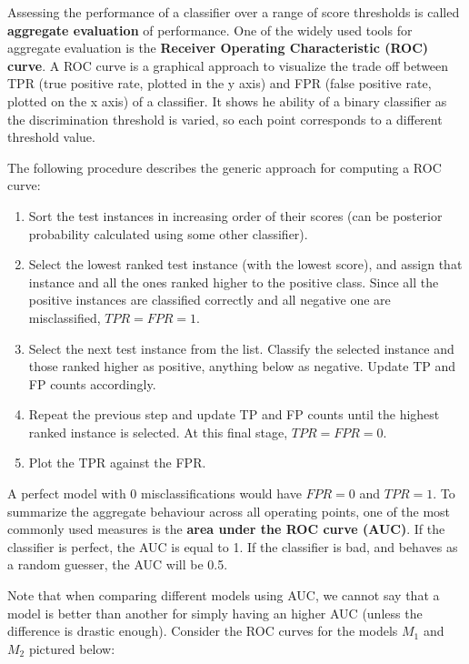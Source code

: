 Assessing the performance of a classifier over a range of score thresholds is called \textbf{aggregate evaluation} of performance. One of the widely used tools for aggregate evaluation is the \textbf{Receiver Operating Characteristic (ROC) curve}. A ROC curve is a graphical approach to visualize the trade off between TPR (true positive rate, plotted in the y axis) and FPR (false positive rate, plotted on the x axis) of a classifier. It shows he ability of a binary classifier as the discrimination threshold is varied, so each point corresponds to a different threshold value.

The following procedure describes the generic approach for computing a ROC curve:

\begin{enumerate}
    \item Sort the test instances in increasing order of their scores (can be posterior probability calculated using some other classifier).

    \item Select the lowest ranked test instance (with the lowest score), and assign that instance and all the ones ranked higher to the positive class. Since all the positive instances are classified correctly and all negative one are misclassified, $TPR = FPR = 1$.

    \item Select the next test instance from the list. Classify the selected instance and those ranked higher as positive, anything below as negative. Update TP and FP counts accordingly.

    \item Repeat the previous step and update TP and FP counts until the highest ranked instance is selected. At this final stage, $TPR = FPR = 0$.

    \item Plot the TPR against the FPR.
\end{enumerate}

A perfect model with 0 misclassifications would have $FPR = 0$ and $TPR = 1$. To summarize the aggregate behaviour across all operating points, one of the most commonly used measures is the \textbf{area under the ROC curve (AUC)}. If the classifier is perfect, the AUC is equal to 1. If the classifier is bad, and behaves as a random guesser, the AUC will be 0.5.

Note that when comparing different models using AUC, we cannot say that a model is better than another for simply having an higher AUC (unless the difference is drastic enough). Consider the ROC curves for the models $M_1$ and $M_2$ pictured below:

